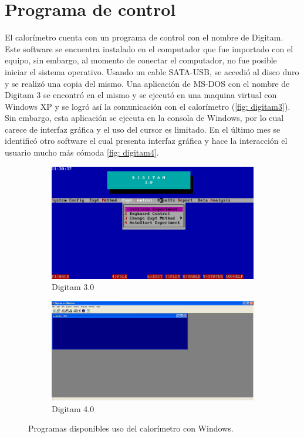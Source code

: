 	\section{Programa de control}
	El calorímetro cuenta con un programa de control con el nombre de Digitam. Este software se encuentra instalado en el computador que fue importado con el equipo, sin embargo, al momento de conectar el computador, no fue posible iniciar el sistema operativo. Usando un cable SATA-USB, se accedió al disco duro y se realizó una copia del mismo. Una aplicación de MS-DOS con el nombre de Digitam 3 se encontró en el mismo y se ejecutó en una maquina virtual con Windows XP y se logr\'o as\'i la comunicación con el calorímetro (\autoref{fig: digitam3}). Sin embargo, esta aplicaci\'on se ejecuta en la consola de Windows, por lo cual carece de interfaz gr\'afica y el uso del cursor es limitado. En el \'ultimo mes se identific\'o otro software el cual presenta interfaz gr\'afica y hace la interacci\'on el usuario mucho m\'as c\'omoda \autoref{fig: digitam4}.
	\begin{figure}[h]
		\centering
		\begin{subfigure}{0.45\linewidth}
			\includegraphics[width=\linewidth]{Figures/digitam}
			\caption{Digitam 3.0}
			\label{fig: digitam3}
		\end{subfigure}
		\begin{subfigure}{0.54\linewidth}
			\includegraphics[width=\linewidth]{Figures/digitamView}
			\caption{Digitam 4.0}
			\label{fig: digitam4}
		\end{subfigure}
		\caption{Programas disponibles uso del calor\'imetro con Windows.}
	\end{figure}
	
